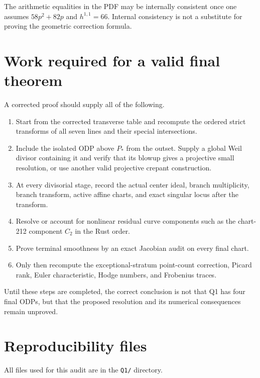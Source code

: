 \documentclass[11pt]{article}
\begin{document}
The arithmetic equalities in the PDF may be internally consistent once one assumes
$58p^2+82p$ and $h^{1,1}=66$.  Internal consistency is not a substitute for proving the
geometric correction formula.

\section{Work required for a valid final theorem}

A corrected proof should supply all of the following.
\begin{enumerate}
  \item Start from the corrected transverse table and recompute the ordered strict transforms
  of all seven lines and their special intersections.
  \item Include the isolated ODP above $P_*$ from the outset.  Supply a global Weil divisor
  containing it and verify that its blowup gives a projective small resolution, or use another
  valid projective crepant construction.
  \item At every divisorial stage, record the actual center ideal, branch multiplicity, branch
  transform, active affine charts, and exact singular locus after the transform.
  \item Resolve or account for nonlinear residual curve components such as the chart-212
  component $C_2$ in the Rust order.
  \item Prove terminal smoothness by an exact Jacobian audit on every final chart.
  \item Only then recompute the exceptional-stratum point-count correction, Picard rank,
  Euler characteristic, Hodge numbers, and Frobenius traces.
\end{enumerate}

Until these steps are completed, the correct conclusion is not that Q1 has four final ODPs,
but that the proposed resolution and its numerical consequences remain unproved.

\section{Reproducibility files}

All files used for this audit are in the \texttt{Q1/} directory.
\end{document}
